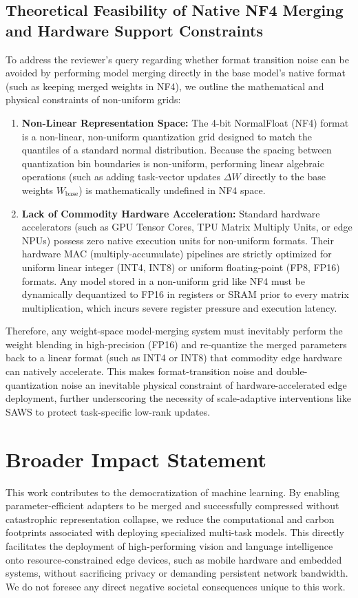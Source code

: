 \documentclass{article}
\theoremstyle{plain}
\theoremstyle{definition}
\theoremstyle{remark}
\begin{document}
\subsection{Theoretical Feasibility of Native NF4 Merging and Hardware Support Constraints}
\label{app:native_nf4_merging}
To address the reviewer's query regarding whether format transition noise can be avoided by performing model merging directly in the base model's native format (such as keeping merged weights in NF4), we outline the mathematical and physical constraints of non-uniform grids:
\begin{enumerate}
  \item \textbf{Non-Linear Representation Space:} The 4-bit NormalFloat (NF4) format is a non-linear, non-uniform quantization grid designed to match the quantiles of a standard normal distribution. Because the spacing between quantization bin boundaries is non-uniform, performing linear algebraic operations (such as adding task-vector updates $\Delta W$ directly to the base weights $W_{\text{base}}$) is mathematically undefined in NF4 space.
  \item \textbf{Lack of Commodity Hardware Acceleration:} Standard hardware accelerators (such as GPU Tensor Cores, TPU Matrix Multiply Units, or edge NPUs) possess zero native execution units for non-uniform formats. Their hardware MAC (multiply-accumulate) pipelines are strictly optimized for uniform linear integer (INT4, INT8) or uniform floating-point (FP8, FP16) formats. Any model stored in a non-uniform grid like NF4 must be dynamically dequantized to FP16 in registers or SRAM prior to every matrix multiplication, which incurs severe register pressure and execution latency.
\end{enumerate}
Therefore, any weight-space model-merging system must inevitably perform the weight blending in high-precision (FP16) and re-quantize the merged parameters back to a linear format (such as INT4 or INT8) that commodity edge hardware can natively accelerate. This makes format-transition noise and double-quantization noise an inevitable physical constraint of hardware-accelerated edge deployment, further underscoring the necessity of scale-adaptive interventions like SAWS to protect task-specific low-rank updates.

\section{Broader Impact Statement}
\label{app:broader_impact}
This work contributes to the democratization of machine learning. By enabling parameter-efficient adapters to be merged and successfully compressed without catastrophic representation collapse, we reduce the computational and carbon footprints associated with deploying specialized multi-task models. This directly facilitates the deployment of high-performing vision and language intelligence onto resource-constrained edge devices, such as mobile hardware and embedded systems, without sacrificing privacy or demanding persistent network bandwidth. We do not foresee any direct negative societal consequences unique to this work.
\end{document}

